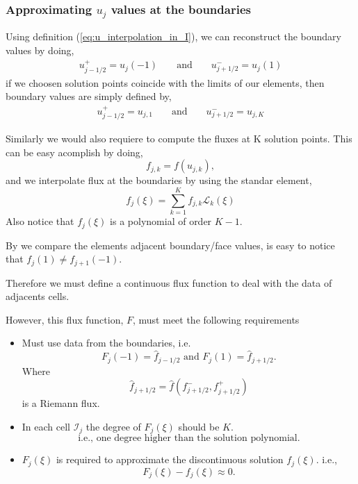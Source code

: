 \begin{frame} \frametitle{Approximating $u_{j}$ values at the boundaries}
	Using definition (\ref{eq:u_interpolation_in_I}), we can reconstruct the boundary values by doing,
	\begin{align}
	&u_{j-1/2}^{+}=u_j(-1)& &\text{ and }& &u_{j+1/2}^{-}=u_j(1)&
	\end{align}
	if we choosen solution points coincide with the limits of our elements, then boundary values are simply defined by,
	\begin{align}
	&u_{j-1/2}^{+}=u_{j,1}& &\text{ and }& &u_{j+1/2}^{-}=u_{j,K}&
	\end{align}
\end{frame}

\begin{frame}
	Similarly we would also requiere to compute the fluxes at K solution points. This can be easy acomplish by doing,
	\begin{equation}
	f_{j,k} = f(u_{j,k}),
	\end{equation}
	and we interpolate flux at the boundaries by using the standar element,
	\begin{equation}
	f_j(\xi) = \sum_{k=1}^{K} f_{j,k} \mathcal{L}_k(\xi)
	\label{eq:f_interpolation_in_I}
	\end{equation}
	Also notice that $f_j(\xi)$ is a polynomial of order $K-1$.
\end{frame}

\begin{frame}
	By we compare the elements adjacent boundary/face values, is easy to notice that {$f_j(1)\neq f_{j+1}(-1)$}.
	
	Therefore we must define a continuous flux function to deal with the data of adjacents cells.
\end{frame}

\begin{frame}
	However, this flux function, $F$, must meet the following requirements
	\begin{itemize}
	\item Must use data from the boundaries, i.e. 
	 \[ F_j(-1)= \hat{f}_{j-1/2} \text{ and } F_j(1)= \hat{f}_{j+1/2}.\] 
	Where \[ \hat{f}_{j+1/2} = \hat{f}(f_{j+1/2}^{-},f_{j+1/2}^{+}) \]
	is a Riemann flux. \pause
	\item In each cell $\mathcal{I}_j$ the degree of $F_j(\xi)$ should be $K$.
	\[ \text{i.e., one degree higher than the solution polynomial.}\] \pause
	\item $F_j(\xi)$ is required to approximate the discontinuous solution $f_j(\xi)$. 
	i.e., \[ F_j(\xi)-f_j(\xi) \approx 0.\] \pause
	\end{itemize}
\end{frame}

